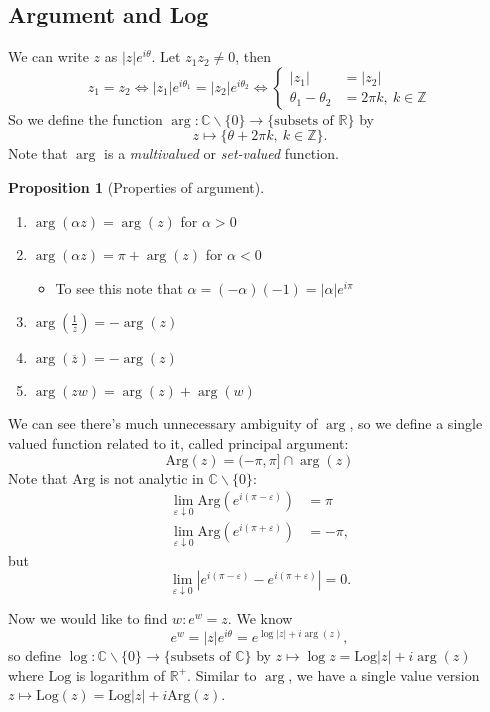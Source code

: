 \documentclass[a4paper]{article}
\newcommand{\Arg}{\text{Arg}}
\newcommand{\Log}{\text{Log}}
\theoremstyle{definition}
\newtheorem{prop}[defn]{Proposition}
\begin{document}
\subsection{Argument and Log}
We can write $z$ as $|z|e^{i\theta}$. Let $z_1 z_2 \neq 0$, then
\[
z_1=z_2 \Leftrightarrow |z_1|e^{i\theta_1}=|z_2|e^{i\theta_2} \Leftrightarrow \left\{ \begin{aligned} |z_1|&=|z_2| \\ \theta_1-\theta_2 &= 2\pi k,\ k\in \mathbb Z \end{aligned} \right.
\]
So we define the function $\arg:\mathbb C\backslash\{0\} \rightarrow \{\text{subsets of }\mathbb R\}$ by
\[
z\mapsto \{\theta+2\pi k,\ k\in\mathbb Z\}.
\]
Note that $\arg$ is a \textit{multivalued} or \textit{set-valued} function.
\begin{prop}[Properties of argument]
\begin{enumerate}
    \item $\arg(\alpha z) = \arg (z)$ for $\alpha >0$
    \item $\arg(\alpha z) = \pi + \arg (z)$ for $\alpha <0$
    \begin{itemize}
        \item To see this note that $\alpha = (-\alpha)(-1) = |\alpha|e^{i\pi}$
    \end{itemize}
    \item $\arg \left(\frac1z\right) = -\arg (z)$
    \item $\arg(\overline{z}) = -\arg (z)$
    \item $\arg (zw) = \arg(z)+\arg(w)$
\end{enumerate}
\end{prop}
We can see there's much unnecessary ambiguity of $\arg$, so we define a single valued function related to it, called principal argument:
\[
\Arg (z) = (-\pi, \pi] \cap \arg (z)
\]
Note that $\Arg$ is not analytic in $\mathbb C\backslash\{0\}$:
\[
\begin{aligned}
\lim_{\varepsilon\downarrow 0}\Arg \left(e^{i(\pi-\varepsilon)} \right) &= \pi \\
\lim_{\varepsilon\downarrow 0}\Arg \left(e^{i(\pi+\varepsilon)} \right) &= -\pi ,
\end{aligned}
\]
but
\[
\lim_{\varepsilon \downarrow 0} \left|e^{i(\pi-\varepsilon)}-e^{i(\pi+\varepsilon)}\right|=0.
\]
\begin{center}
\end{center}
Now we would like to find $w:e^w=z.$ We know
\[
e^w = |z|e^{i\theta} = e^{\log |z| + i\arg (z)},
\]
so define $\log:\mathbb C\backslash \{0\} \rightarrow \{\text{subsets of }\mathbb C\}$ by $z\mapsto \log z = \Log |z|+i\arg (z)$ where $\Log$ is logarithm of $\mathbb R^+.$ Similar to $\arg$, we have a single value version $z\mapsto \Log(z) = \Log|z|+i \Arg(z)$.
\end{document}
